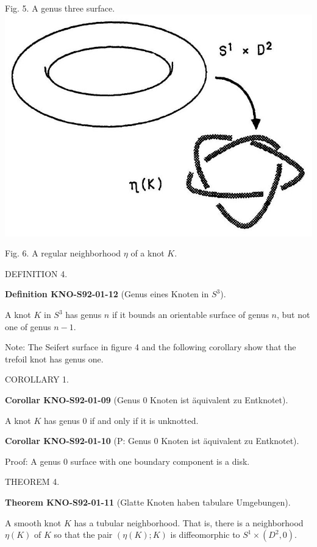 \documentclass[10pt, letterpaper]{article}
\newcommand{\CustomHeading}[3]{%
  \par\medskip\noindent%
  \textbf{#1 #2} \textnormal{(#3)}.\enskip%
}
\newenvironment{DEF}[2]{\begin{unitbox}\CustomHeading{Definition}{#1}{#2}}{\end{unitbox}}
\newenvironment{THEO}[2]{\begin{unitbox}\CustomHeading{Theorem}{#1}{#2}}{\end{unitbox}}
\newenvironment{KORO}[2]{\begin{unitbox}\CustomHeading{Corollar}{#1}{#2}}{\end{unitbox}}
\begin{document}
Fig. 5. A genus three surface.\\
\includegraphics[scale=0.2, center]{2025_05_21_037de704f595ce642d3eg-079(1)}

Fig. 6. A regular neighborhood $\eta$ of a knot $K$.

DEFINITION 4. 

\begin{DEF}{KNO-S92-01-12}{Genus eines Knoten in $S^3$}
A knot $K$ in $S^{3}$ has genus $n$ if it bounds an orientable surface of genus $n$, but not one of genus $n-1$.
\end{DEF}

Note: The Seifert surface in figure 4 and the following corollary show that the trefoil knot has genus one.

COROLLARY 1. 

\begin{KORO}{KNO-S92-01-09}{Genus 0 Knoten ist äquivalent zu Entknotet}
A knot $K$ has genus 0 if and only if it is unknotted.
\end{KORO}

\begin{KORO}{KNO-S92-01-10}{P: Genus 0 Knoten ist äquivalent zu Entknotet}
Proof: A genus 0 surface with one boundary component is a disk.
\end{KORO}


THEOREM 4. 

\begin{THEO}{KNO-S92-01-11}{Glatte Knoten haben tabulare Umgebungen}
A smooth knot $K$ has a tubular neighborhood. That is, there is a neighborhood $\eta(K)$ of $K$ so that the pair $(\eta(K) ; K)$ is diffeomorphic to $S^{1} \times\left(D^{2}, 0\right)$.
\end{THEO}
\end{document}
